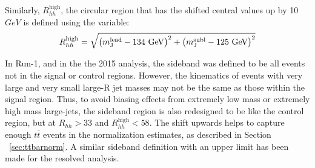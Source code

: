 Similarly, $R_{hh}^{\text{high}}$, the circular region that has the shifted central values up by 10 $GeV$ is defined using the variable:\begin{equation}
\label{eq:boosted_RhhhighDef}
R_{hh}^{\text{high}} = \sqrt{\left(m^{\rm lead}_{\rm J} - \text{134 GeV}\right)^2 + \left(m^{\rm subl}_{\rm J} - \text{125 GeV}\right)^2}
\end{equation}

In Run-1, and in the the 2015 analysis, the sideband was defined to be all events not in the signal or control regions. However, the kinematics of events with very large and very small large-R jet masses may not be the same as those within the signal region. Thus, to avoid biasing effects from extremely low mass or extremely high mass large-\R jets, the sideband region is also redesigned to be like the control region, but at $R_{hh} > 33$ and $R_{hh}^{\text{high}} < 58$. The shift upwards helps to capture enough $t\bar{t}$ events in the normalization estimates, as described in Section ~\ref{sec:ttbarnorm}. A similar sideband definition with an upper limit has been made for the resolved analysis.

